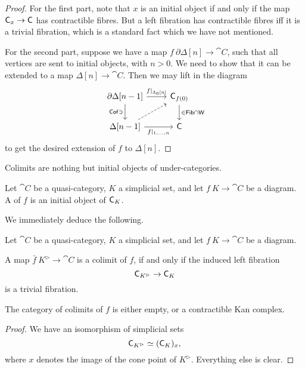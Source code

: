 \begin{proof}
    For the first part, note that $x$ is an initial object 
    if and only if the map $\mathsf{C}_{x\/}\to\mathsf{C}$ has contractible fibres.
    But a left fibration has contractible fibres iff
    it is a trivial fibration, which is a standard fact which we have not mentioned.

    For the second part, suppose we have a map $f\:\partial\Delta[n]\to\cat{C}$,
    such that all vertices are sent to initial objects, with $n>0$.
    We need to show that it can be extended to a map $\Delta[n]\to\cat{C}$.
    Then we may lift in the diagram 
    \[ \begin{tikzcd}
        \partial\Delta[n-1] \ar[d,"\cat{Cof}\ni"'] \ar[r,"f|_{\Lambda_0[n]}"] &
        \cat{C}_{f(0)\/} \ar[d,"\in\cat{Fib}\cap\cat{W}"] \\
        \Delta[n-1] \ar[r,"f|_{1\comma\dotsc\comma n}"'] \ar[ur,dashed] &
        \cat{C}
    \end{tikzcd} \]
    to get the desired extension of $f$ to $\Delta[n]$.
\end{proof}

Colimits are nothing but initial objects of under-categories.

\begin{definition}
    Let $\cat C$ be a quasi-category,
    $K$ a simplicial set,
    and let $f\:K\to\cat C$ be a diagram.
    A  of $f$ is an initial object of $\mathsf{C}_{K\/}$.
\end{definition}

We immediately deduce the following.

\begin{corollary}
    Let $\cat C$ be a quasi-category,
    $K$ a simplicial set,
    and let $f\:K\to\cat C$ be a diagram.
    \begin{itms}
        \item A map $\bar f\:K^\vartriangleright\to\cat C$
        is a colimit of $f$, if and only if
        the induced left fibration
        \[ \mathsf{C}_{K^\vartriangleright\/}\to\mathsf{C}_{K\/} \]
        is a trivial fibration.
        \item The category of colimits of $f$ 
        is either empty, or a contractible Kan complex.
    \end{itms}
\end{corollary}

\begin{proof}
    We have an isomorphism of simplicial sets
    \[ \mathsf{C}_{K^\vartriangleright\/}\simeq(\mathsf{C}_{K\/})_{x\/}, \]
    where $x$ denotes the image of the cone point of $K^\vartriangleright$.
    Everything else is clear.
\end{proof}

